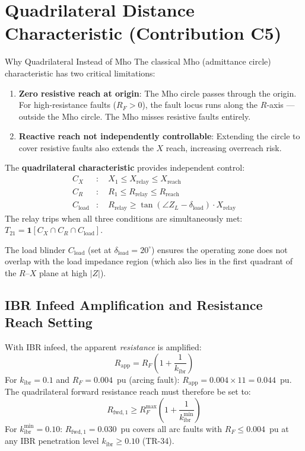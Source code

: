 \documentclass[12pt,a4paper]{article}
\newcommand{\kibr}{k_\mathrm{ibr}}
\begin{document}
\section{Quadrilateral Distance Characteristic (Contribution C5)}

\begin{archbox}{Why Quadrilateral Instead of Mho}
The classical Mho (admittance circle) characteristic has two critical limitations:
\begin{enumerate}[nosep]
  \item \textbf{Zero resistive reach at origin}: The Mho circle passes through the origin. For high-resistance faults ($R_F > 0$), the fault locus runs along the $R$-axis --- outside the Mho circle. The Mho misses resistive faults entirely.
  \item \textbf{Reactive reach not independently controllable}: Extending the circle to cover resistive faults also extends the $X$ reach, increasing overreach risk.
\end{enumerate}
The \textbf{quadrilateral characteristic} provides independent control:
\begin{align}
  C_X &: \quad X_1 \leq X_\mathrm{relay} \leq X_\mathrm{reach} \label{eq:quad_x}\\
  C_R &: \quad R_1 \leq R_\mathrm{relay} \leq R_\mathrm{reach} \label{eq:quad_r}\\
  C_\mathrm{load} &: \quad R_\mathrm{relay} \geq \tan(\angle Z_L - \delta_\mathrm{load}) \cdot X_\mathrm{relay}
  \label{eq:quad_load}
\end{align}
The relay trips when all three conditions are simultaneously met: $T_{21} = \mathbf{1}[C_X \cap C_R \cap C_\mathrm{load}]$.

The load blinder $C_\mathrm{load}$ (set at $\delta_\mathrm{load} = 20^\circ$) ensures the operating zone does not overlap with the load impedance region (which also lies in the first quadrant of the $R$--$X$ plane at high $|Z|$).
\end{archbox}

\subsection{IBR Infeed Amplification and Resistance Reach Setting}

With IBR infeed, the apparent \emph{resistance} is amplified:
\begin{equation}
  R_\mathrm{app} = R_F \left(1 + \frac{1}{\kibr}\right)
  \label{eq:rfwd_amplification}
\end{equation}
For $\kibr = 0.1$ and $R_F = 0.004$~pu (arcing fault): $R_\mathrm{app} = 0.004 \times 11 = 0.044$~pu. The quadrilateral forward resistance reach must therefore be set to:
\[
  R_\mathrm{fwd,1} \geq R_F^\mathrm{max} \left(1 + \frac{1}{\kibr^\mathrm{min}}\right)
\]
For $\kibr^\mathrm{min} = 0.10$: $R_\mathrm{fwd,1} = 0.030$~pu covers all arc faults with $R_F \leq 0.004$~pu at any IBR penetration level $\kibr \geq 0.10$ (TR-34).
\end{document}
